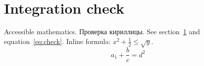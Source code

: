 \documentclass{article}
\begin{document}
\tableofcontents
\section{Integration check}\label{sec:check}
Accessible mathematics. Проверка кириллицы.
See section~\ref{sec:check} and equation~\eqref{eq:check}.
Inline formula: $x^2 + \frac{1}{2} \leq \sqrt{y}$.
\begin{equation}\label{eq:check}
  a_1 + \frac{b}{c} = d^2
\end{equation}
\end{document}
